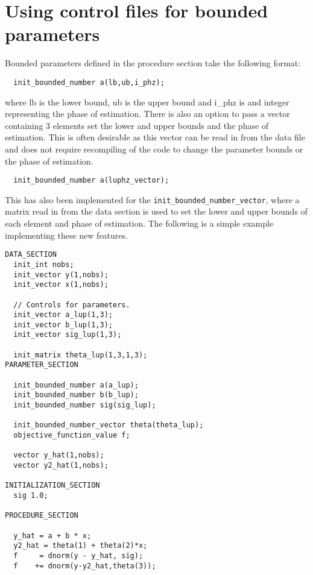 \documentclass{admbmanual}
\begin{document}
\section{Using control files for bounded parameters}
%
{}
Bounded parameters defined in the procedure section take the following format:
\begin{lstlisting}
  init_bounded_number a(lb,ub,i_phz);
\end{lstlisting}
where lb is the lower bound, ub is the upper bound and i\_phz is and integer
representing the phase of estimation. There is also an option to pass a vector
containing 3 elements set the lower and upper bounds and the phase of
estimation. This is often desirable as this vector can be read in from the data
file and does not require recompiling of the code to change the parameter bounds
or the phase of estimation.

\begin{lstlisting}
  init_bounded_number a(luphz_vector);
\end{lstlisting}

This has also been implemented for the \texttt{init\_bounded\_number\_vector},
where a matrix read in from the data section is used to set the lower and upper
bounds of each element and phase of estimation. The following is a simple
example implementing these new features.

\begin{lstlisting}
DATA_SECTION
  init_int nobs;
  init_vector y(1,nobs);
  init_vector x(1,nobs);

  // Controls for parameters.
  init_vector a_lup(1,3);
  init_vector b_lup(1,3);
  init_vector sig_lup(1,3);

  init_matrix theta_lup(1,3,1,3);
PARAMETER_SECTION

  init_bounded_number a(a_lup);
  init_bounded_number b(b_lup);
  init_bounded_number sig(sig_lup);

  init_bounded_number_vector theta(theta_lup);
  objective_function_value f;

  vector y_hat(1,nobs);
  vector y2_hat(1,nobs);

INITIALIZATION_SECTION
  sig 1.0;

PROCEDURE_SECTION

  y_hat = a + b * x;
  y2_hat = theta(1) + theta(2)*x;
  f     = dnorm(y - y_hat, sig);
  f    += dnorm(y-y2_hat,theta(3));
\end{lstlisting}
\end{document}
